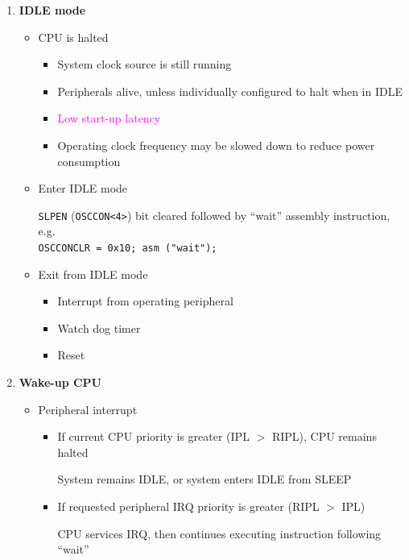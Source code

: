 \documentclass[a4paper]{article}
\begin{document}
\begin{enumerate}[label = \arabic*.]
    \item \textbf{IDLE mode}
      \begin{itemize}[leftmargin = 1cm]
        \item CPU is halted
          \begin{itemize}[leftmargin = 1cm]
            \item System clock source is still running
            \item Peripherals alive, unless individually configured to halt when in IDLE
            \item \textcolor{magenta}{Low start-up latency}
            \item Operating clock frequency may be slowed down to reduce power consumption
          \end{itemize}
        \item Enter IDLE mode
          \par \verb|SLPEN| (\verb|OSCCON<4>|) bit cleared followed by “wait” assembly instruction, e.g.  \\
          \verb|OSCCONCLR = 0x10; asm ("wait");|
        \item Exit from IDLE mode
          \begin{itemize}[leftmargin = 1cm]
            \item Interrupt from operating peripheral
            \item Watch dog timer
            \item Reset
          \end{itemize}
      \end{itemize}

    \item \textbf{Wake-up CPU}
      \begin{itemize}[leftmargin = 1cm]
        \item Peripheral interrupt
          \begin{itemize}[leftmargin = 1cm]
            \item If current CPU priority is greater (IPL \( > \) RIPL), CPU remains halted
              \par System remains IDLE, or system enters IDLE from SLEEP
            \item If requested peripheral IRQ priority is greater (RIPL \( > \) IPL)
              \par CPU services IRQ, then continues executing instruction following “wait”
          \end{itemize}


\end{itemize}
\end{enumerate}
\end{document}
